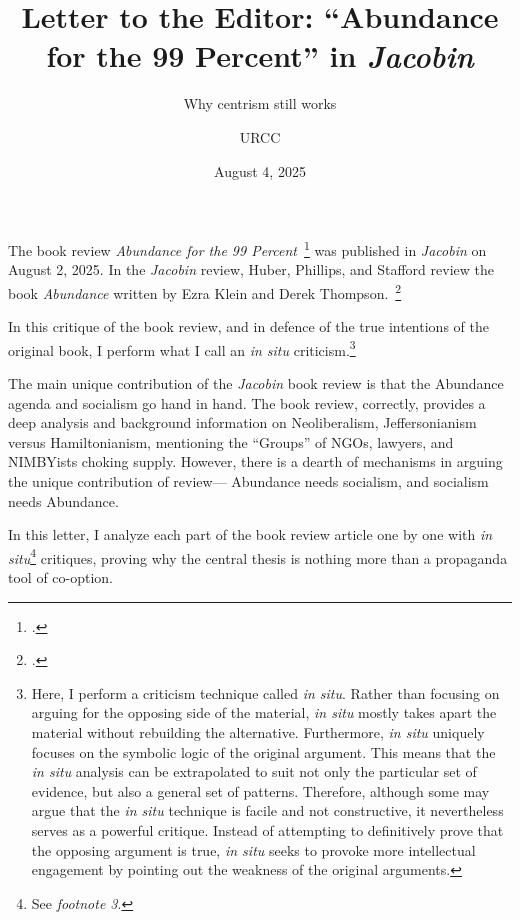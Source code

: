 \documentclass[12pt]{article}
\begin{document}
\title{Letter to the Editor: \enquote{Abundance for the 99 Percent} in \emph{Jacobin}}
\subtitle{Why centrism still works}
\author{URCC}

\date{August 4, 2025}

\maketitle

\begin{preamble}
	The book review \emph{Abundance for the 99 Percent}~\footcite{huberAbundance99Percent2025} was published in \emph{Jacobin} on August 2, 2025. In the \emph{Jacobin} review, Huber, Phillips, and Stafford review the book \emph{Abundance} written by Ezra Klein and Derek Thompson.~\footcite{kleinAbundance2025}

	In this critique of the book review, and in defence of the true intentions of the original book, I perform what I call an \emph{in situ} criticism.\footnote{Here, I perform a criticism technique called \emph{in situ}. Rather than focusing on arguing for the opposing side of the material, \emph{in situ} mostly takes apart the material without rebuilding the alternative. Furthermore, \emph{in situ} uniquely focuses on the symbolic logic of the original argument. This means that the \emph{in situ} analysis can be extrapolated to suit not only the particular set of evidence, but also a general set of patterns. Therefore, although some may argue that the \emph{in situ} technique is facile and not constructive, it nevertheless serves as a powerful critique. Instead of attempting to definitively prove that the opposing argument is true, \emph{in situ} seeks to provoke more intellectual engagement by pointing out the weakness of the original arguments.}
\end{preamble}

The main unique contribution of the \emph{Jacobin} book review is that the Abundance agenda and socialism go hand in hand. The book review, correctly, provides a deep analysis and background information on Neoliberalism, Jeffersonianism versus Hamiltonianism, mentioning the ``Groups'' of NGOs, lawyers, and NIMBYists choking supply. However, there is a dearth of mechanisms in arguing the unique contribution of review--- Abundance needs socialism, and socialism needs Abundance.

In this letter, I analyze each part of the book review article one by one with \emph{in situ}\footnote{See \emph{footnote 3}.} critiques, proving why the central thesis is nothing more than a propaganda tool of co-option.
\end{document}
